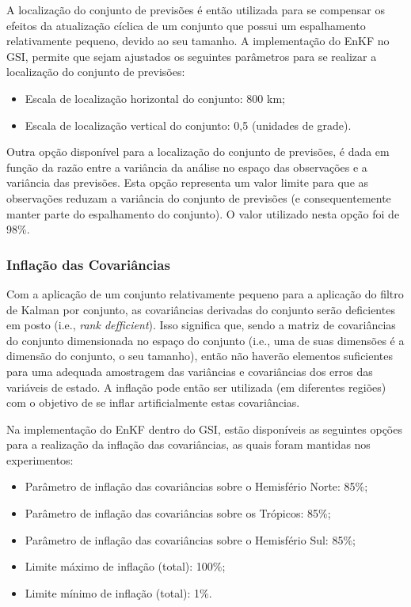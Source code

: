 A localização do conjunto de previsões é então utilizada para se compensar os efeitos da atualização cíclica de um conjunto que possui um espalhamento relativamente pequeno, devido ao seu tamanho. A implementação do EnKF no GSI, permite que sejam ajustados os seguintes parâmetros para se realizar a localização do conjunto de previsões:

\begin{itemize}
    \item Escala de localização horizontal do conjunto: 800 km;
    \item Escala de localização vertical do conjunto: 0,5 (unidades de grade).
\end{itemize}

Outra opção disponível para a localização do conjunto de previsões, é dada em função da razão entre a variância da análise no espaço das observações e a variância das previsões. Esta opção representa um valor limite para que as observações reduzam a variância do conjunto de previsões (e consequentemente manter parte do espalhamento do conjunto). O valor utilizado nesta opção foi de 98\%.

\subsubsection*{Inflação das Covariâncias}

Com a aplicação de um conjunto relativamente pequeno para a aplicação do filtro de Kalman por conjunto, as covariâncias derivadas do conjunto serão deficientes em posto (i.e., \textit{rank defficient}). Isso significa que, sendo a matriz de covariâncias do conjunto dimensionada no espaço do conjunto (i.e., uma de suas dimensões é a dimensão do conjunto, o seu tamanho), então não haverão elementos suficientes para uma adequada amostragem das variâncias e covariâncias dos erros das variáveis de estado. A inflação pode então ser utilizada (em diferentes regiões) com o objetivo de se inflar artificialmente estas covariâncias.

Na implementação do EnKF dentro do GSI, estão disponíveis as seguintes opções para a realização da inflação das covariâncias, as quais foram mantidas nos experimentos:

\begin{itemize}
    \item Parâmetro de inflação das covariâncias sobre o Hemisfério Norte: 85\%;
    \item Parâmetro de inflação das covariâncias sobre os Trópicos: 85\%;
    \item Parâmetro de inflação das covariâncias sobre o Hemisfério Sul: 85\%;
    \item Limite máximo de inflação (total): 100\%;
    \item Limite mínimo de inflação (total): 1\%.
\end{itemize}

